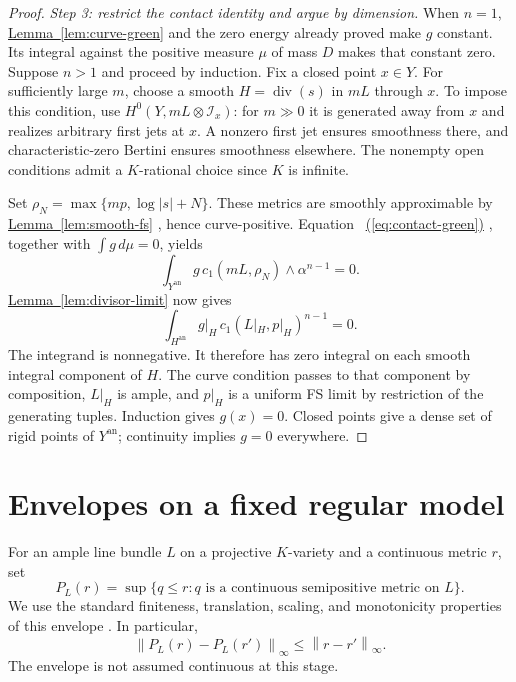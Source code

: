 \documentclass[11pt]{amsart}
\theoremstyle{definition}
\theoremstyle{remark}
\numberwithin{equation}{section}
\newcommand{\an}{\mathrm{an}}
\newcommand{\norm}[1]{\left\lVert#1\right\rVert}
\newcommand{\namedref}[2]{%
 \begingroup
 \ifstrequal{#1}{Section}{\hypersetup{linkcolor=sectionteal}}{%
  \ifstrequal{#1}{Appendix}{\hypersetup{linkcolor=sectionteal}}{}}%
 \hyperref[#2]{#1~\ref*{#2}}%
 \endgroup}
\renewcommand{\eqref}[1]{%
 \begingroup\hypersetup{linkcolor=equationviolet}%
 \hyperref[#1]{\textup{(\ref*{#1})}}%
 \endgroup}
\DeclareMathOperator{\divisor}{div}
\begin{document}
\begin{proof}
\emph{Step 3: restrict the contact identity and argue by dimension.}
When \(n=1\), \namedref{Lemma}{lem:curve-green} and the zero energy
already proved make \(g\) constant. Its integral against the
positive measure \(\mu\) of mass \(D\) makes that constant zero.
Suppose \(n>1\) and proceed by induction. Fix a closed point
\(x\in Y\). For sufficiently large \(m\), choose a smooth
\(H=\divisor(s)\) in \(mL\) through \(x\). To impose this
condition, use \(H^0(Y,mL\otimes\mathcal I_x)\): for \(m\gg0\)
it is generated away from \(x\) and realizes arbitrary first jets
at \(x\). A nonzero first jet ensures smoothness there, and
characteristic-zero Bertini ensures smoothness elsewhere. The
nonempty open conditions admit a \(K\)-rational choice since
\(K\) is infinite.

Set \(\rho_N=\max\{mp,\log|s|+N\}\). These metrics are smoothly
approximable by \namedref{Lemma}{lem:smooth-fs}, hence curve-positive.
Equation~\eqref{eq:contact-green}, together with
\(\int g\,d\mu=0\), yields
\[
 \int_{Y^\an}g\,c_1(mL,\rho_N)\wedge\alpha^{n-1}=0.
\]
\namedref{Lemma}{lem:divisor-limit} now gives
\[
 \int_{H^\an}g|_H\,c_1(L|_H,p|_H)^{n-1}=0.
\]
The integrand is nonnegative. It therefore has zero integral on
each smooth integral component of \(H\). The curve condition
passes to that component by composition, \(L|_H\) is ample, and
\(p|_H\) is a uniform FS limit by restriction of the generating
tuples. Induction gives \(g(x)=0\). Closed points give a dense
set of rigid points of \(Y^\an\); continuity implies \(g=0\)
everywhere.
\end{proof}

\section{Envelopes on a fixed regular model}\label{sec:envelopes}

For an ample line bundle \(L\) on a projective \(K\)-variety and a
continuous metric \(r\), set
\begin{equation}\label{eq:envelope-definition}
 P_L(r)=\sup\{q\le r:q\text{ is a continuous semipositive metric on }L\}.
\end{equation}
We use the standard finiteness, translation, scaling, and monotonicity
properties of this envelope \cite[Remark~6.2 and Proposition~6.3]{BGM}.
In particular,
\begin{equation}\label{eq:envelope-lipschitz}
 \norm{P_L(r)-P_L(r')}_\infty\le \norm{r-r'}_\infty.
\end{equation}
The envelope is not assumed continuous at this stage.
\end{document}
